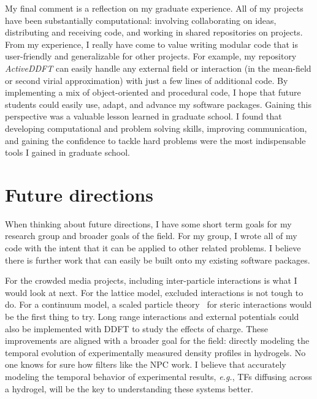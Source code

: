 My final comment is a reflection on my graduate experience. All of my projects
have been substantially computational: involving collaborating on ideas,
distributing and receiving code, and working in shared repositories on projects.
From my experience, I really have come to value writing modular code that is
user-friendly and generalizable for other projects. For example, my repository
\textit{ActiveDDFT} can easily handle any external field or interaction (in the
mean-field or second virial approximation) with just a few lines of additional
code.  By implementing a mix of object-oriented and procedural code, I hope
that future students could easily use, adapt, and advance my software packages.
Gaining this perspective was a valuable lesson learned in graduate school. I
found that developing computational and problem solving skills, improving
communication, and gaining the confidence to tackle hard problems were the most
indispensable tools I gained in graduate school. 

\section{Future directions}

When thinking about future directions, I have some short term goals for my
research group and broader goals of the field. For my group, I wrote all
of my code with the intent that it can be applied to other related problems. I
believe there is further work that can easily be built onto my existing software
packages.

For the crowded media projects, including inter-particle interactions is what
I would look at next. For the lattice model, excluded interactions is not tough
to do. For a continuum model, a scaled particle
theory~\cite{helfand_theory_61} for steric interactions would be the first thing
to try. Long range interactions and external potentials could also be
implemented with DDFT to study the effects of charge. These improvements are
aligned with a broader goal for the field: directly modeling the temporal
evolution of experimentally measured density profiles in hydrogels.  No one
knows for sure how filters like the NPC work. I believe that accurately modeling
the temporal behavior of experimental results, \textit{e.g.}, TFs diffusing
across a hydrogel, will be the key to understanding these systems better.

